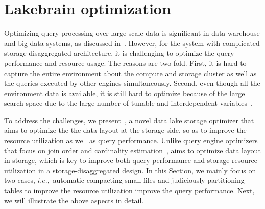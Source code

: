 




\section{Lakebrain optimization} 
\label{sec:lakebrain}

Optimizing  query processing over large-scale data is significant in data warehouse and big data systems, as discussed in~\cite{}. However, for the \sys system with
complicated storage-disaggregated architecture, it is challenging to optimize the query performance and resource usage. The reasons are two-fold. First, it is hard to capture the entire environment about the compute and storage cluster as well as the queries executed by other engines simultaneously. Second, even though all the environment data is available, it is still hard to optimize because of the large search space due to the large number of tunable and interdependent variables~\cite{}.



To address the challenges, we present~\brain, a novel data lake storage optimizer that aims to optimize the  the data layout at the storage-side, so as to improve the resource utilization as well as  query performance.
 Unlike query engine optimizers that focus on join order and cardinality estimation~\cite{}, \brain aims to optimize data layout in storage, which is key to improve both query performance and storage resource utilization in a storage-disaggregated design. In this Section, we mainly focus on two cases, $i.e.,$ automatic compacting small files  and judiciously partitioning tables to improve the resource utilization improve the query performance.
Next, we will illustrate the above aspects in detail.



